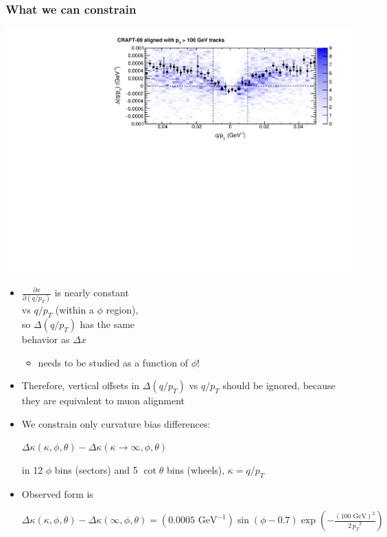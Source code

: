 \documentclass[compress]{beamer}
\begin{document}
\begin{frame}
\frametitle{What we can constrain}

\hfill \includegraphics[width=0.5\linewidth]{curvature_real.pdf}

\vspace{-2.3 cm}
\begin{itemize}
\item $\frac{\partial x}{\partial (q/p_T)}$ is nearly 
  constant \\ vs $q/p_T$ (within a $\phi$ region), \\ so $\Delta(q/p_T)$ has
  the same \\ behavior as $\Delta x$
\begin{itemize}
\item needs to be studied as a function of $\phi$!
\end{itemize}

\item Therefore, vertical offsets in $\Delta(q/p_T)$ vs $q/p_T$ should
  be ignored, because they are equivalent to muon alignment

\item We constrain only curvature bias differences:
\begin{center}
$\Delta \kappa(\kappa, \phi, \theta) - \Delta \kappa(\kappa \to \infty, \phi, \theta)$
\end{center}
in 12 $\phi$ bins (sectors) and 5 $\cot\theta$ bins (wheels), $\kappa = q/p_T$

\item Observed form is

{\hspace{-1 cm}\begin{minipage}{1.15\linewidth}
$\displaystyle \Delta \kappa(\kappa, \phi, \theta) - \Delta \kappa(\infty, \phi, \theta) = (0.0005\mbox{ GeV}^{-1}) \sin(\phi - 0.7) \exp\left(-\frac{(100\mbox{ GeV})^2}{{2 \, p_T}^2}\right)$
\end{minipage}\mbox{\hspace{-3 cm}}}

\end{itemize}
\end{frame}
\end{document}
